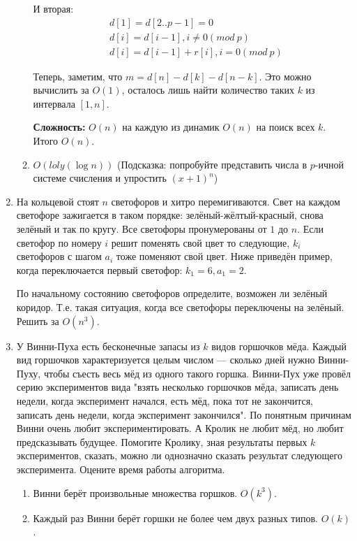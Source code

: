 \begin{enumerate}
\begin{enumerate}
		И вторая:
		\begin{align*}
		&d[1] = d[2..p-1] = 0 \\
		&d[i] = d[i - 1], i \neq 0 (mod \ p) \\
		&d[i] = d[i - 1] + r[i], i = 0(mod \ p)
		\end{align*}
		
		Теперь, заметим, что $m = d[n] - d[k] - d[n - k]$. Это можно вычислить за $O(1)$, осталось лишь найти количество таких $k$ из интервала $[1, n]$. 
		
		\textbf{Сложность:} $O(n)$ на каждую из динамик $O(n)$ на поиск всех $k$. Итого $O(n)$.
		
		\item $O(loly(\log n))$ (Подсказка: попробуйте представить числа в $p$-ичной системе счисления и упростить $(x + 1)^n$)
	\end{enumerate}
	
	\item На кольцевой стоят $n$ светофоров и хитро перемигиваются. Свет на каждом светофоре зажигается в таком 
	порядке: зелёный-жёлтый-красный, снова зелёный и так по кругу. Все светофоры пронумерованы от $1$ до $n$. Если 
	светофор по номеру $i$ решит поменять свой цвет то следующие, $k_i$ светофоров с шагом $a_i$ тоже поменяют свой 
	цвет. Ниже приведён пример, когда переключается	первый светофор: $k_1 = 6, a_1 = 2$.
	
	По начальному состоянию светофоров определите, возможен ли зелёный коридор. Т.е. такая ситуация, когда все 
	светофоры переключены на зелёный. Решить за $O(n^3)$.

	\item У Винни-Пуха есть бесконечные запасы из $k$ видов горшочков мёда. Каждый вид горшочков характеризуется 
	целым числом — сколько дней нужно Винни-Пуху, чтобы съесть весь мёд из одного такого горшка. Винни-Пух уже 
	провёл серию экспериментов вида "взять несколько горшочков мёда, записать день недели, когда эксперимент 
	начался, есть мёд, пока тот не закончится, записать день недели, когда эксперимент закончился". По понятным 
	причинам Винни очень любит экспериментировать. А Кролик не любит мёд, но любит предсказывать будущее. Помогите 
	Кролику, зная результаты первых $k$ экспериментов, сказать, можно ли однозначно сказать результат следующего 
	эксперимента. Оцените время работы алгоритма.
	\begin{enumerate}
		\item Винни берёт произвольные множества горшков. $O(k^3)$.
		\item Каждый раз Винни берёт горшки не более чем двух разных типов. $O(k)$.
	\end{enumerate}
	
\end{enumerate}
	
